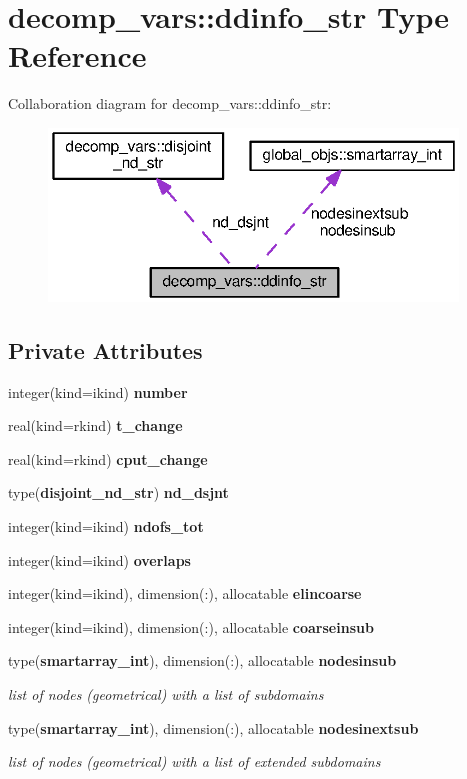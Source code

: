 \section{decomp\+\_\+vars\+:\+:ddinfo\+\_\+str Type Reference}
\label{structdecomp__vars_1_1ddinfo__str}


Collaboration diagram for decomp\+\_\+vars\+:\+:ddinfo\+\_\+str\+:\nopagebreak
\begin{figure}[H]
\begin{center}
\leavevmode
\includegraphics[width=308pt]{structdecomp__vars_1_1ddinfo__str__coll__graph}
\end{center}
\end{figure}
\subsection*{Private Attributes}
\begin{DoxyCompactItemize}
\item 
integer(kind=ikind) {\bf number}
\item 
real(kind=rkind) {\bf t\+\_\+change}
\item 
real(kind=rkind) {\bf cput\+\_\+change}
\item 
type({\bf disjoint\+\_\+nd\+\_\+str}) {\bf nd\+\_\+dsjnt}
\item 
integer(kind=ikind) {\bf ndofs\+\_\+tot}
\item 
integer(kind=ikind) {\bf overlaps}
\item 
integer(kind=ikind), dimension(\+:), allocatable {\bf elincoarse}
\item 
integer(kind=ikind), dimension(\+:), allocatable {\bf coarseinsub}
\item 
type({\bf smartarray\+\_\+int}), dimension(\+:), allocatable {\bf nodesinsub}
\begin{DoxyCompactList}\small\item\em list of nodes (geometrical) with a list of subdomains \end{DoxyCompactList}\item 
type({\bf smartarray\+\_\+int}), dimension(\+:), allocatable {\bf nodesinextsub}
\begin{DoxyCompactList}\small\item\em list of nodes (geometrical) with a list of extended subdomains \end{DoxyCompactList}\end{DoxyCompactItemize}


